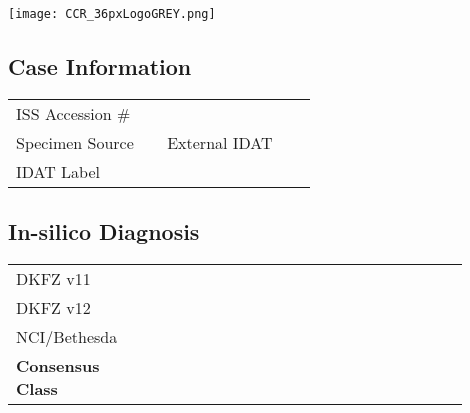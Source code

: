\documentclass[
	letterpaper, %
	11pt, %
]{CSSullivanBusinessReport}
\begin{document}

\thispagestyle{empty} %

\vspace*{-0.075\textheight} %

\hspace*{-0.5cm}\texttt{[image: CCR\_36pxLogoGREY.png]} %

{\fontsize{18pt}{20pt}\selectfont\raggedright\textbf{\reporttitle}\par} %

{\textit{\textbf{\reportsubtitle}}\par} %

{\reportdate\par} %

\subsection*{Case Information}

\begin{tabular}{@{} L{0.3\linewidth} L{0.3\linewidth} @{}} %
	\toprule
	ISS Accession \# & \\
	Specimen Source & External IDAT\\
	IDAT Label & \\
	\bottomrule
\end{tabular}

\subsection*{In-silico Diagnosis}
\begin{tabular}{@{} L{0.2\linewidth} L{0.5\linewidth} L{0.2\linewidth} @{}} %
	\toprule
	DKFZ v11 &  & \\
	DKFZ v12 &  & \\
	NCI/Bethesda &  & \\
	\textbf{Consensus Class} & \textbf{}\\
	\bottomrule
\end{tabular}
\end{document}
